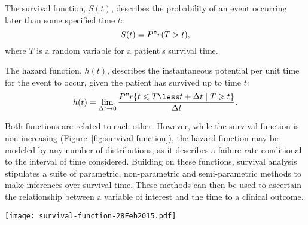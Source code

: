 The survival function, $S(t)$, describes the probability of an event occurring
later than some specified time $t$:
\begin{equation}
  \label{eq:survival-function}
  S(t) = P"r(T > t),
\end{equation}
where $T$ is a random variable for a patient's survival time.

The hazard function, $h(t)$, describes the instantaneous potential per unit time
for the event to occur, given the patient has survived up to time $t$:
\begin{equation}
  \label{eq:hazard-function}
  h(t) = \lim_{\Delta t \to 0}\frac{P"r\{t \leqslant T \less t + \Delta t
    \mid T \geqslant t \}}{\Delta t}.
\end{equation}


Both functions are related to each other.  However, while the survival function
is non-increasing (Figure~\ref{fig:survival-function}), the hazard function may
be modeled by any number of distributions, as it describes a failure rate
conditional to the interval of time considered.  Building on these functions,
survival analysis stipulates a suite of parametric, non-parametric and
semi-parametric methods to make inferences over survival time.  These methods
can then be used to ascertain the relationship between a variable of interest
and the time to a clinical outcome.

\begin{marginfigure}%
  \texttt{[image: survival-function-28Feb2015.pdf]}
  \caption[Survival function]{The survival function, $S(t)$ describes the
    likelihood that a patient will have a lifetime exceeding time $t$.
    \textbf{A:}~The theoretical distribution is non-increasing, and
    characterized by $S(0)=1$ and $S(\infty)=0$.  \textbf{B:}~In practice, the
    estimated survival function, $\hat{S}(t)$, often takes the shape of a step
    function.  Because study periods are never infinite and there may be
    competing risks for failure, it is likely that not all patients will
    experience a clinical outcome by the end of the
    study.}\label{fig:survival-function}%
\end{marginfigure}

